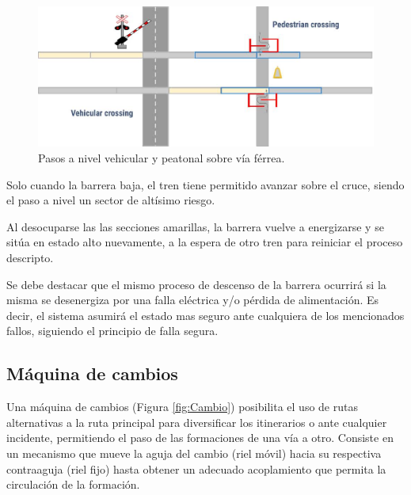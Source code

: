 			\begin{figure}[h!]
				\centering
				\includegraphics[scale=0.4]{./Figures/Paso a nivel}
				\caption{Pasos a nivel vehicular y peatonal sobre vía férrea.}
				\label{fig:Paso_a_nivel}
			\end{figure}
			
			Solo cuando la barrera baja, el tren tiene permitido avanzar sobre el cruce, siendo el paso a nivel un sector de altísimo riesgo.
			
			Al desocuparse las las secciones amarillas, la barrera vuelve a energizarse y se sitúa en estado alto nuevamente, a la espera de otro tren para reiniciar el proceso descripto.
						
			Se debe destacar que el mismo proceso de descenso de la barrera ocurrirá si la misma se desenergiza por una falla eléctrica y/o pérdida de alimentación. Es decir, el sistema asumirá el estado mas seguro ante cualquiera de los mencionados fallos, siguiendo el principio de falla segura.
		
		\subsection{Máquina de cambios}
			
			Una máquina de cambios (Figura \ref{fig:Cambio}) posibilita el uso de rutas alternativas a la ruta principal para diversificar los itinerarios o ante cualquier incidente, permitiendo el paso de las formaciones de una vía a otro. Consiste en un mecanismo que mueve la aguja del cambio (riel móvil) hacia su respectiva contraaguja (riel fijo) hasta obtener un adecuado acoplamiento que permita la circulación de la formación.
			
